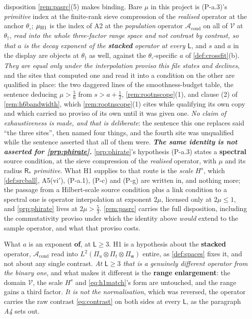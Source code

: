 disposition \cref{rem:pasrc}\textup{(5)} makes binding. Bare $\mu$ in this project is (P-a.3)'s
\emph{primitive} index at the finite-rank sieve compression of the \emph{realised} operator at the anchor
$\theta_\circ$; $\mu_{\text{\textup{H1}}}$ is the index of A2 at the \emph{population}
operator $\mathcal A_{\mathrm{cond}}$ on all of $\mathcal V$ at $\theta_\dagger$, \emph{read into the
whole three-factor range space and not contrast by contrast, so that $a$ is the decay exponent of the
\textbf{stacked} operator at every $\mathsf L$}, and $s$ and $a$ in the
display are objects at $\theta_\dagger$ as well, against the $\theta_\circ$-specific $a$ of
\cref{def:crossfit}(b). \emph{They are equal only under the interpolation proviso this file states and
declines}, and the sites that computed one and read it into a condition on the other are qualified
in place: the two daggered lines of the smoothness-budget table, the sentence deducing
$\mu>\tfrac56$ from $s>a+\tfrac12$, \cref{rem:rootnscope}\textup{(1)}, and clause \textup{(2)} of
\cref{rem:h6bandwidth}, which \cref{rem:rootnscope}\textup{(1)} cites while qualifying its own copy
and which carried no proviso of its own until it was given one. \emph{No claim of exhaustiveness is
made, and that is deliberate}: the sentence this one replaces said ``the three sites'', then named
four things, and the fourth site was unqualified while the sentence asserted that all of them were.
\emph{\textbf{The same identity is \textbf{not} asserted for \cref{prp:phirate}.}}
\cref{prp:phirate}'s hypothesis (P-a.3) states a
\textbf{spectral} source condition, at the sieve compression of the \emph{realised} operator, with $\mu$
and its radius $\mathsf R_\ast$ \emph{primitive}. What H1 supplies to that route is the \emph{scale}
$H^{s}$, which \cref{def:srcball}, A5(vi$'$), (P-a.1), (P-c) and (P-g) are written in, 
and nothing more; the passage from a Hilbert-scale source condition plus a link condition to a spectral
one is operator interpolation at exponent $2\mu$, licensed only at $2\mu\le1$, and
\cref{prp:phirate} lives at $2\mu>\tfrac53$. \cref{rem:pasrc} carries the full disposition, including
the commutativity proviso under which the identity above \emph{would} extend to the sample operator, and
what that proviso costs.

What $a$ is an exponent \textbf{of}, at $\mathsf L\ge3$. H1 is a hypothesis about the
\textbf{stacked} operator, $\mathcal A_{\mathrm{cond}}$ read into
$L^{2}(\Pi_u\otimes\Pi_t\otimes\Pi_{\mathsf w})$ entire, as \cref{def:spaces} fixes it, and not about
any single contrast. \emph{At $\mathsf L\ge3$ that is a genuinely different operator from the binary one},
and what makes it different is the \textbf{range enlargement}: the domain $\mathcal V$, the scale $H^{s}$
and \eqref{eq:h1match}'s form are untouched, and the range gains a third factor. \emph{It is not the
normalisation}, which was reversed, the operator carries the raw contrast \eqref{eq:contrast} on both
sides at every $\mathsf L$, as the paragraph \emph{A4} sets out.

